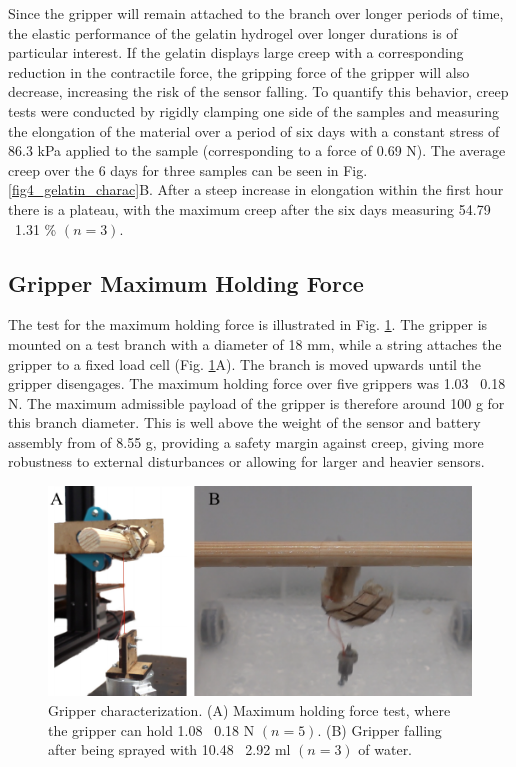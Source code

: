
Since the gripper will remain attached to the branch over longer periods of time, the elastic performance of the gelatin hydrogel over longer durations is of particular interest. If the gelatin displays large creep with a corresponding reduction in the contractile force, the gripping force of the gripper will also decrease, increasing the risk of the sensor falling. To quantify this behavior, creep tests were conducted by rigidly clamping one side of the samples and measuring the elongation of the material over a period of six days with a constant stress of 86.3 kPa applied to the sample (corresponding to a force of 0.69 N). The average creep over the 6 days for three samples can be seen in Fig. \ref{fig4_gelatin_charac}B. After a steep increase in elongation  within the first hour there is a plateau, with the maximum creep after the six days measuring 54.79 \textpm~1.31 \% $(n=3)$.


\subsection{Gripper Maximum Holding Force}
The test for the maximum holding force is illustrated in Fig. \ref{fig6_gripper_characterization}. The gripper is mounted on a test branch with a diameter of 18 mm, while a string attaches the gripper to a fixed load cell (Fig. \ref{fig6_gripper_characterization}A). The branch is moved upwards until the gripper disengages. The maximum holding force over five grippers was 1.03 \textpm~0.18 N. The maximum admissible payload of the gripper is therefore around 100 g for this branch diameter. This is well above the weight of the sensor and battery assembly from \cite{Geckeler2022a} of 8.55 g, providing a safety margin against creep, giving more robustness to external disturbances or allowing for larger and heavier sensors.

\begin{figure}[!t]
\centering
\includegraphics[width=1\columnwidth]{figures/figure6-gripper-charac/figure6-gripper-charac.pdf}
\caption{Gripper characterization. (A) Maximum holding force test, where the gripper can hold 1.08 \textpm~0.18 N $(n=5)$. (B) Gripper falling after being sprayed with 10.48 \textpm~2.92 ml $(n=3)$ of water.}
\label{fig6_gripper_characterization}
\end{figure}

